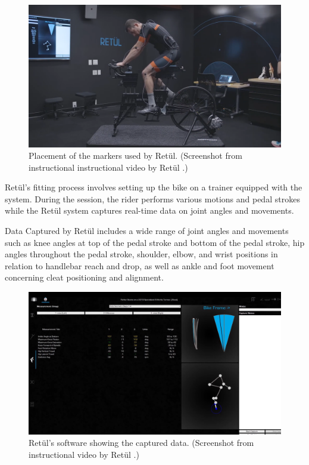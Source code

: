 \begin{figure}[htbp]
    \centering
    \includegraphics[width=\textwidth]{obrazky-figures/retul_markers.png}
    \caption{Placement of the markers used by Retül. (Screenshot from instructional instructional video by Retül \cite{retulMarkersYoutube}.)}
    \label{fig:retul_markers}
\end{figure}

Retül's fitting process involves setting up the bike on a trainer equipped with the system. During the session, the rider performs various motions and pedal strokes while the Retül system captures real-time data on joint angles and movements.

Data Captured by Retül includes a wide range of joint angles and movements such as knee angles at top of the pedal stroke and bottom of the pedal stroke, hip angles throughout the pedal stroke, shoulder, elbow, and wrist positions in relation to handlebar reach and drop, as well as ankle and foot movement concerning cleat positioning and alignment.

\begin{figure}[htbp]
    \centering
    \includegraphics[width=\textwidth]{obrazky-figures/retul_app.png}
    \caption{Retül's software showing the captured data. (Screenshot from  instructional video by Retül \cite{retulScreenYoutube}.)}
    \label{fig:retul_app}
\end{figure}

